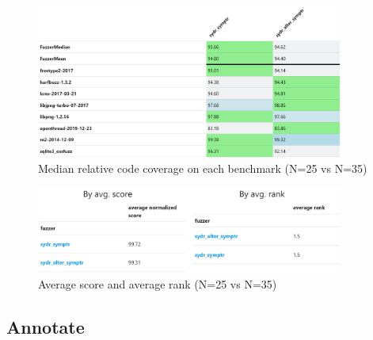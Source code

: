 \begin{figure}[h]
    \centering
    \includegraphics[width=0.9\textwidth]{assets/fuzzbench/symptr-25-vs-35-2/median-relative-code-coverage-on-each-benchmark.png}
    \caption{Median relative code coverage on each benchmark (N=25 vs N=35)}
    \label{fig:fuzzbench-symptr-25-vs-35-2-coverage}
\end{figure}

\begin{figure}[h]
    \centering
    \includegraphics[width=0.9\textwidth]{assets/fuzzbench/symptr-25-vs-35-2/avg-score-avg-rank.png}
    \caption{Average score and average rank (N=25 vs N=35)}
    \label{fig:fuzzbench-symptr-25-vs-35-2-score-rank}
\end{figure}

\subsection{Annotate} \label{results:annotate}

